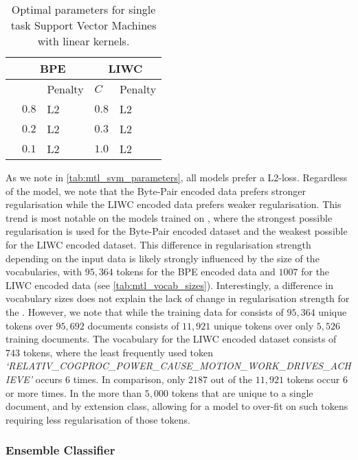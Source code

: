 \begin{table}[]
\centering
\begin{tabular}{l|ll|ll}
                     & \multicolumn{2}{c}{BPE} & \multicolumn{2}{c}{LIWC} \\ \hline
                     &         & Penalty       & $C$      & Penalty       \\ \hline
\cite{Waseem:2016}   & $0.8$   & L2            & $0.8$    & L2            \\
\cite{Davidson:2017} & $0.2$   & L2            & $0.3$    & L2            \\
\cite{Wulczyn:2017}  & $0.1$   & L2            & $1.0$    & L2
\end{tabular}
\caption{Optimal parameters for single task Support Vector Machines with linear kernels.}
\label{tab:mtl_svm_parameters}
\end{table}

As we note in \autoref{tab:mtl_svm_parameters}, all models prefer a L2-loss. Regardless of the model, we note that the Byte-Pair encoded data prefers stronger regularisation while the LIWC encoded data prefers weaker regularisation. This trend is most notable on the models trained on \citet{Wulczyn:2017}, where the strongest possible regularisation is used for the Byte-Pair encoded dataset and the weakest possible for the LIWC encoded dataset. This difference in regularisation strength depending on the input data is likely strongly influenced by the size of the vocabularies, with $95,364$ tokens for the BPE encoded data and $1007$ for the LIWC encoded data (see \autoref{tab:mtl_vocab_sizes}). Interestingly, a difference in vocabulary sizes does not explain the lack of change in regularisation strength for the \citet{Waseem:2016}. However, we note that while the training data for \citet{Wulczyn:2017} consists of $95,364$ unique tokens over $95,692$ documents \citet{Waseem:2016} consists of $11,921$ unique tokens over only $5,526$ training documents. The vocabulary for the LIWC encoded \citet{Waseem:2016} dataset consists of $743$ tokens, where the least frequently used token \textit{`RELATIV\_COGPROC\_POWER\_CAUSE\_MOTION\_WORK\_DRIVES\_ACHIEVE'} occurs $6$ times. In comparison, only $2187$ out of the $11,921$ tokens occur $6$ or more times. In the more than $5,000$ tokens that are unique to a single document, and by extension class, allowing for a model to over-fit on such tokens requiring less regularisation of those tokens.

\subsubsection{Ensemble Classifier}


